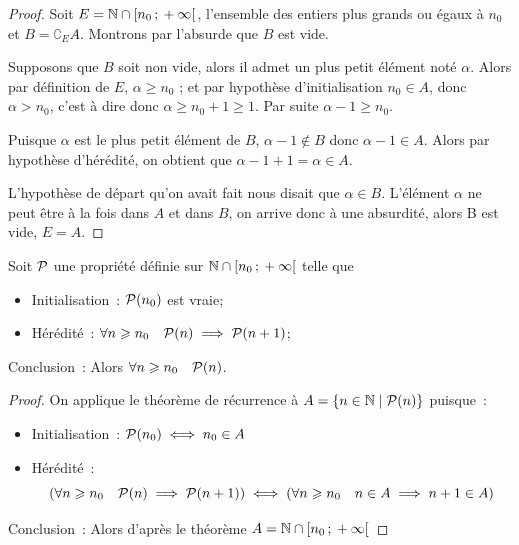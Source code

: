 \begin{proof}
  Soit \(E = \N\cap \intervallefo{n_0}{+\infty}\), l'ensemble des entiers plus
  grands ou égaux à \(n_0\) et \(B = \complement_E A\). Montrons par l'absurde
  que \(B\) est vide.

  Supposons que \(B\) soit non vide, alors il admet un plus petit élément noté
  \(\alpha\). Alors par définition de \(E\), \(\alpha\geqslant n_0\) ; et par
  hypothèse d'initialisation \(n_0\in A\), donc \(\alpha > n_0\), c'est à dire
  donc \(\alpha\geqslant n_0 + 1\geqslant 1\). Par suite \(\alpha - 1\geqslant
  n_0\).

  Puisque \(\alpha\) est le plus petit élément de \(B\), \(\alpha - 1 \notin B\)
  donc \(\alpha - 1 \in A\). Alors par hypothèse d'hérédité, on obtient que
  \(\alpha - 1 + 1 = \alpha\in A\).

  L'hypothèse de départ qu'on avait fait nous disait que \(\alpha \in B\).
  L'élément \(\alpha\) ne peut être à la fois dans \(A\) et dans \(B\), on
  arrive donc à une absurdité, alors B est vide, \(E = A\).
\end{proof}

\begin{cor}
  \label{cor:recsimple}
  Soit \(\P\) une propriété définie sur \(\N\cap \intervallefo{n_0}{+\infty}\)
  telle que
  \begin{itemize}
    \item Initialisation~: \(\P(n_0)\) est vraie;
    \item Hérédité~: \(\forall n\geqslant n_0 \quad \P(n) \implies \P(n + 1)\);
  \end{itemize}
  Conclusion~: Alors \(\forall n\geqslant n_0 \quad \P(n)\).
\end{cor}

\begin{proof}
  On applique le théorème de récurrence à \(A = \enstq{n\in\N}{\P(n)}\)
  puisque~:
  \begin{itemize}
    \item Initialisation~: \(\P(n_0) \iff n_0 \in A\)
    \item Hérédité~:
      \begin{equation}
        \left(\forall n\geqslant n_0 \quad \P(n) \implies \P(n + 1)\right) \iff
        \left( \forall n \geqslant n_0 \quad n\in A \implies n + 1\in A\right)
      \end{equation}
  \end{itemize}
  Conclusion~: Alors d'après le théorème \(A = \N\cap
  \intervallefo{n_0}{+\infty}\)
\end{proof}

